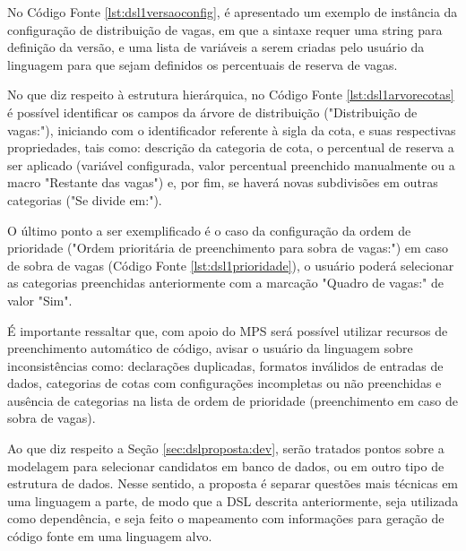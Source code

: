    No Código Fonte \ref{lst:dsl1versaoconfig}, é apresentado um exemplo de instância da configuração de distribuição de vagas, em que a sintaxe requer uma string para definição da versão, e uma lista de variáveis a serem criadas pelo usuário da linguagem para que sejam definidos os percentuais de reserva de vagas.
   
   


No que diz respeito à estrutura hierárquica, no Código Fonte \ref{lst:dsl1arvorecotas} é possível identificar os campos da árvore de distribuição ("Distribuição de vagas:"), iniciando com o identificador referente à sigla da cota, e suas respectivas propriedades, tais como: descrição da categoria de cota, o percentual de reserva a ser aplicado (variável configurada, valor percentual preenchido manualmente ou a macro "Restante das vagas") e, por fim, se haverá novas subdivisões em outras categorias ("Se divide em:").

   


O último ponto a ser exemplificado é o caso da configuração da ordem de prioridade ("Ordem prioritária de preenchimento para sobra de vagas:") em caso de sobra de vagas (Código Fonte \ref{lst:dsl1prioridade}), o usuário poderá selecionar as categorias preenchidas anteriormente com a marcação "Quadro de vagas:" de valor "Sim".  

   

É importante ressaltar que, com apoio do \gls{MPS} será possível utilizar recursos de preenchimento automático de código, avisar o usuário da linguagem sobre inconsistências como: declarações duplicadas, formatos inválidos de entradas de dados, categorias de cotas com configurações incompletas ou não preenchidas e ausência de categorias na lista de ordem de prioridade (preenchimento em caso de sobra de vagas). 

Ao que diz respeito a Seção \ref{sec:dslproposta:dev}, serão tratados pontos sobre a modelagem para selecionar candidatos em banco de dados, ou em outro tipo de estrutura de dados. Nesse sentido, a proposta é separar questões mais técnicas em uma linguagem a parte, de modo que a \gls{DSL} descrita anteriormente, seja utilizada como dependência, e seja feito o mapeamento com informações para geração de código fonte em uma linguagem alvo.